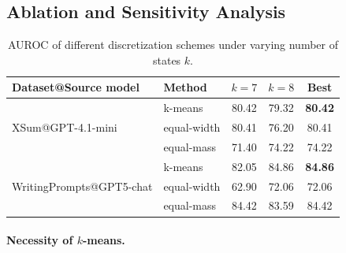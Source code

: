 \documentclass{article}
\theoremstyle{plain}
\theoremstyle{definition}
\theoremstyle{remark}
\begin{document}
\subsection{Ablation and Sensitivity Analysis} 


\begin{table}[htbp]
\centering
{\tiny
\begin{tabular}{l l c c c}
\toprule
Dataset@Source model      & Method              & $k=7$ & $k=8$ & Best \\
\midrule
         & k-means            & 80.42 & 79.32 & \textbf{80.42} \\
XSum@GPT-4.1-mini          & equal-width  & 80.41 & 76.20  & 80.41 \\
        & equal-mass   & 71.40 & 74.22 & 74.22 \\
\midrule
  & k-means             & 82.05 & 84.86 & \textbf{84.86} \\
WritingPrompts@GPT5-chat  & equal-width & 62.90 & 72.06  & 72.06 \\
  & equal-mass    & 84.42 & 83.59 & 84.42 \\
\bottomrule
\end{tabular}
\caption{AUROC of different discretization schemes under varying number of states $k$.}
\label{tab:discretization-k}}
\end{table}
\vspace{-2mm}
\paragraph{Necessity of $k$-means.}
\end{document}
